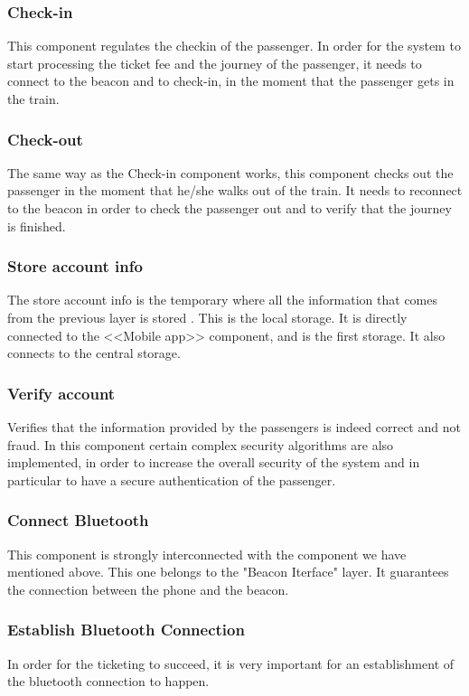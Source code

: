\subsubsection{Check-in}
This component regulates the checkin of the passenger. In order for the system to start processing the ticket fee and the journey of the passenger, it needs to connect to the beacon and to check-in, in the moment that the passenger gets in the train. 
\subsubsection{Check-out} 
The same way as the  Check-in component works, this component checks out the passenger in the moment that he/she walks out of the train. It needs to reconnect to the beacon in order to check the passenger out and to verify that the journey is finished.

\subsubsection{Store account info}
The store account info is the temporary where all the information that comes from the previous layer is stored . This is the local storage. It is directly connected to the <<Mobile app>> component, and is the first storage. It also connects to the central storage.

\subsubsection{Verify account}
Verifies that the information provided by the passengers is indeed correct and not fraud. In this component certain complex security algorithms are also implemented, in order to increase the overall security of the system and in particular to have a secure authentication of the passenger.

\subsubsection{Connect Bluetooth}
This component is strongly interconnected with the component we have mentioned above. This one belongs to the "Beacon Iterface" layer. It guarantees the connection between the phone and the beacon.

\subsubsection{Establish Bluetooth Connection} 
In order for the ticketing to succeed, it is very important for an  establishment of the bluetooth connection to happen. 

